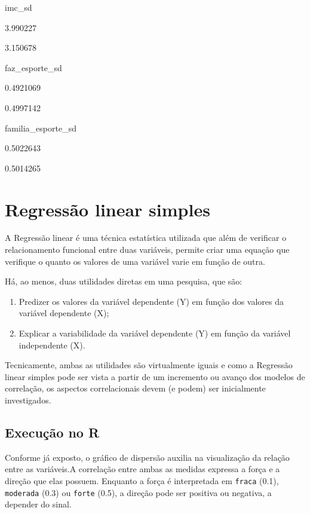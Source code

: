 \documentclass[
]{book}
\begin{document}
imc\_sd

3.990227

3.150678

faz\_esporte\_sd

0.4921069

0.4997142

familia\_esporte\_sd

0.5022643

0.5014265

\hypertarget{regressuxe3o-linear-simples-1}{%
\section{Regressão linear simples}\label{regressuxe3o-linear-simples-1}}

A Regressão linear é uma técnica estatística utilizada que além de verificar o relacionamento funcional entre duas variáveis, permite criar uma equação que verifique o quanto os valores de uma variável varie em função de outra.

Há, ao menos, duas utilidades diretas em uma pesquisa, que são:

\begin{enumerate}
\def\labelenumi{(\roman{enumi})}
\item
  Predizer os valores da variável dependente (Y) em função dos valores da variável dependente (X);
\item
  Explicar a variabilidade da variável dependente (Y) em função da variável independente (X).
\end{enumerate}

Tecnicamente, ambas as utilidades são virtualmente iguais e como a Regressão linear simples pode ser vista a partir de um incremento ou avanço dos modelos de correlação, os aspectos correlacionais devem (e podem) ser inicialmente investigados.

\hypertarget{execuuxe7uxe3o-no-r-4}{%
\subsection{Execução no R}\label{execuuxe7uxe3o-no-r-4}}

Conforme já exposto, o gráfico de dispersão auxilia na visualização da relação entre as variáveis.A correlação entre ambas as medidas expressa a força e a direção que elas possuem. Enquanto a força é interpretada em \texttt{fraca} (0.1), \texttt{moderada} (0.3) ou \texttt{forte} (0.5), a direção pode ser positiva ou negativa, a depender do sinal.
\end{document}
